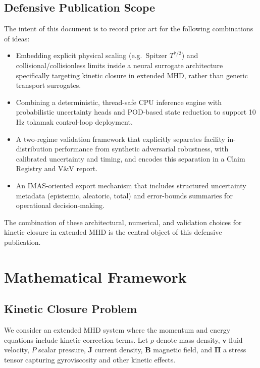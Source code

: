 \documentclass[11pt]{article}
\begin{document}
\subsection{Defensive Publication Scope}

The intent of this document is to record prior art for the following combinations of ideas:

\begin{itemize}
  \item Embedding explicit physical scaling (e.g.\ Spitzer $T^{7/2}$) and collisional/collisionless limits inside a neural surrogate architecture specifically targeting kinetic closure in extended MHD, rather than generic transport surrogates.

  \item Combining a deterministic, thread-safe CPU inference engine with probabilistic uncertainty heads and POD-based state reduction to support 10\,Hz tokamak control-loop deployment.

  \item A two-regime validation framework that explicitly separates facility in-distribution performance from synthetic adversarial robustness, with calibrated uncertainty and timing, and encodes this separation in a Claim Registry and V\&V report.

  \item An IMAS-oriented export mechanism that includes structured uncertainty metadata (epistemic, aleatoric, total) and error-bounds summaries for operational decision-making.

\end{itemize}

The combination of these architectural, numerical, and validation choices for kinetic closure in extended MHD is the central object of this defensive publication.

\section{Mathematical Framework}

\subsection{Kinetic Closure Problem}

We consider an extended MHD system where the momentum and energy equations include kinetic correction terms. Let $\rho$ denote mass density, $\bm{v}$ fluid velocity, $P$ scalar pressure, $\bm{J}$ current density, $\bm{B}$ magnetic field, and $\bm{\Pi}$ a stress tensor capturing gyroviscosity and other kinetic effects.
\end{document}
